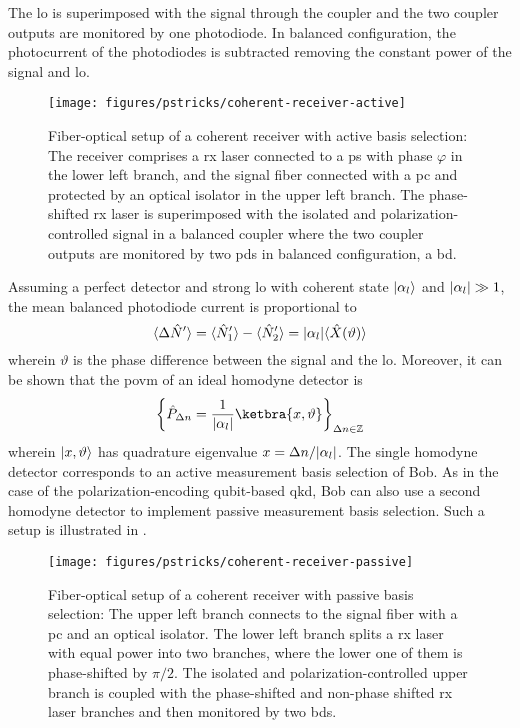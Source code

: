 The \gls{lo} is superimposed with the signal through the coupler and the two coupler outputs are monitored by one photodiode.
In balanced configuration, the photocurrent of the photodiodes is subtracted removing the constant power of the signal and \gls{lo}.
\begin{figure}[htb]
	\centering
	\texttt{[image: figures/pstricks/coherent-receiver-active]}
	\caption{Fiber-optical setup of a coherent receiver with active basis selection: The receiver comprises a \gls{rx} laser connected to a \gls{ps} with phase $\varphi$ in the lower left branch, and the signal fiber connected with a \gls{pc} and protected by an optical isolator in the upper left branch. The phase-shifted \gls{rx} laser is superimposed with the isolated and polarization-controlled signal in a balanced coupler where the two coupler outputs are monitored by two \gls{pd}s in balanced configuration, a \gls{bd}.}\label{fig:coherent_receiver_active}
\end{figure}
Assuming a perfect detector and strong \gls{lo} with coherent state $\lvert\alpha_l\rangle$ and $\lvert\alpha_l\rvert\gg1$, the mean balanced photodiode current is proportional to~\cite[p.~217]{Vogel2006}
\begin{equation}
	\langle\Delta\hat{N}^\prime\rangle
	=
	\langle\hat{N}_1^\prime\rangle
	-
	\langle\hat{N}_2^\prime\rangle
	=
	\lvert\alpha_l\rvert
	\langle\hat{X}(\vartheta)\rangle
\end{equation}
wherein $\vartheta$ is the phase difference between the signal and the \gls{lo}.
Moreover, it can be shown that the \gls{povm} of an ideal homodyne detector is~\cite[p.~220]{Vogel2006}
\begin{equation}
	\left\{\hat{P}_{\Delta n}=\frac{1}{\abs{\alpha_l}}\ketbra{x,\vartheta}\right\}_{\Delta n\in\mathbb{Z}}
\end{equation}
wherein $\lvert x,\vartheta\rangle$ has quadrature eigenvalue $x=\Delta n/\lvert\alpha_l\rvert$.
The single homodyne detector corresponds to an active measurement basis selection of Bob.
As in the case of the polarization-encoding qubit-based \gls{qkd}, Bob can also use a second homodyne detector to implement passive measurement basis selection.
Such a setup is illustrated in .
\begin{figure}[htb]
	\centering
	\texttt{[image: figures/pstricks/coherent-receiver-passive]}
	\caption{Fiber-optical setup of a coherent receiver with passive basis selection: The upper left branch connects to the signal fiber with a \gls{pc} and an optical isolator. The lower left branch splits a \gls{rx} laser with equal power into two branches, where the lower one of them is phase-shifted by $\pi/2$. The isolated and polarization-controlled upper branch is coupled with the phase-shifted and non-phase shifted \gls{rx} laser branches and then monitored by two \gls{bd}s.}\label{fig:coherent_receiver_passive}
\end{figure}
